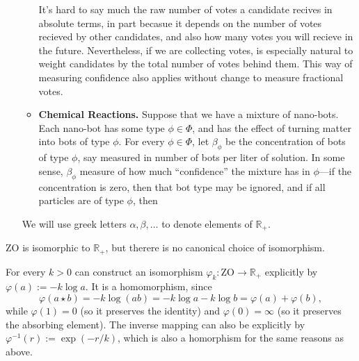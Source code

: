 \documentclass{article}
\def\ZO{\mathrm{ZO}}
\def\Rplus{\mathbb R_+}
\begin{document}
\begin{itemize}
\begin{itemize}
        It's hard to say much  the raw number of votes a candidate recives in absolute terms, in part becasue it depends on the number of votes recieved by other candidates, and also how many votes you will recieve in the future. 
        Nevertheless, if we are collecting votes, is especially natural to weight candidates by the total number of votes behind them. 
        This way of measuring confidence also applies without change to measure fractional votes.
         
        \item \textbf{Chemical Reactions.} 
        Suppose that we have a mixture of nano-bots.
        Each nano-bot has some type $\phi \in \Phi$, and has the effect of turning matter into bots of type $\phi$.
        For every $\phi \in \Phi$, let $\beta_\phi$ be the concentration of bots of type $\phi$, say measured in number of bots per liter of solution.
        In some sense, $\beta_\phi$ measure of how much ``confidence'' the mixture has in $\phi$---if the concentration is zero, then that bot type may be ignored, and if all particles are of type $\phi$, then 
        
        \TODO
        
        
    \end{itemize}
    
    We will use greek letters $\alpha, \beta, \ldots$ to denote elements of $\Rplus$.

\end{itemize}


\begin{prop}
    $\ZO$ is isomorphic to $\Rplus$, but therere is no canonical choice of isomorphism.
\end{prop}
\begin{lproof}
    For every $k > 0$ can construct an isomorphism $\varphi_k: \ZO \to \Rplus$ explicitly by $\varphi(a) := - k \log a$.
    It is a homomorphism, since
    \[
        \varphi(a \star b) = - k \log (a b) = - k \log a - k \log b =
            \varphi(a) + \varphi(b),
    \]
    while $\varphi(1) = 0$ (so it preserves the identity) and $\varphi(0) = \infty$ (so it preserves the absorbing element).
    The inverse mapping can also be explicitly by $\varphi^{-1}(r) := \exp( - r / k)$, which is also a homorphism for the same reasons as above.
\end{lproof}
\end{document}
